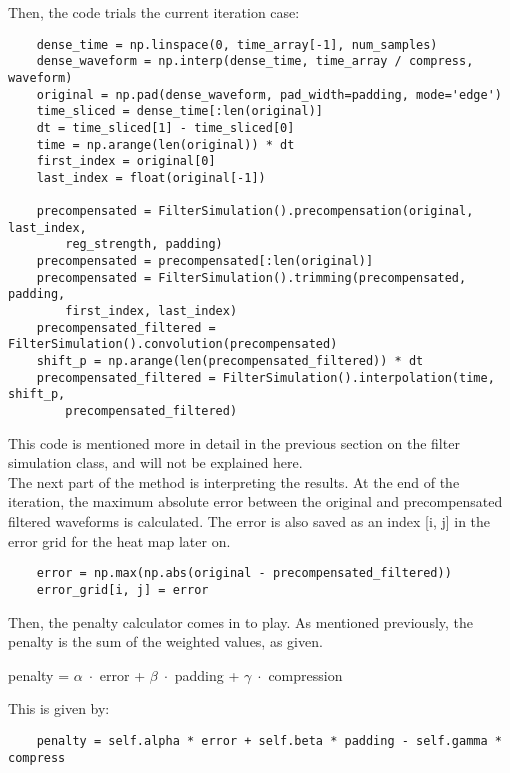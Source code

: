 Then, the code trials the current iteration case:

\begin{verbatim}
    dense_time = np.linspace(0, time_array[-1], num_samples)
    dense_waveform = np.interp(dense_time, time_array / compress, waveform)
    original = np.pad(dense_waveform, pad_width=padding, mode='edge')
    time_sliced = dense_time[:len(original)]
    dt = time_sliced[1] - time_sliced[0]
    time = np.arange(len(original)) * dt
    first_index = original[0]
    last_index = float(original[-1])
    
    precompensated = FilterSimulation().precompensation(original, last_index, 
        reg_strength, padding)
    precompensated = precompensated[:len(original)]
    precompensated = FilterSimulation().trimming(precompensated, padding, 
        first_index, last_index)
    precompensated_filtered = FilterSimulation().convolution(precompensated)
    shift_p = np.arange(len(precompensated_filtered)) * dt
    precompensated_filtered = FilterSimulation().interpolation(time, shift_p, 
        precompensated_filtered)
\end{verbatim}

This code is mentioned more in detail in the previous section on the filter simulation class, and will not be explained here.
\\
The next part of the method is interpreting the results. At the end of the iteration, the maximum absolute error between the original and precompensated filtered waveforms is calculated. The error is also saved as an index [i, j] in the error grid for the heat map later on.

\begin{verbatim}
    error = np.max(np.abs(original - precompensated_filtered))
    error_grid[i, j] = error
\end{verbatim}

Then, the penalty calculator comes in to play. As mentioned previously, the penalty is the sum of the weighted values, as given.

\begin{center}
    penalty = $\alpha \; \cdot$ error + $\beta \; \cdot$ padding + $\gamma \; \cdot$ compression
\end{center}

This is given by:

\begin{verbatim}
    penalty = self.alpha * error + self.beta * padding - self.gamma * compress
\end{verbatim}

